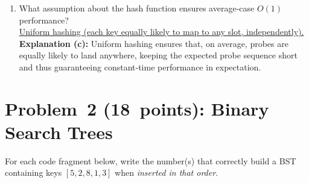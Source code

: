 \documentclass[12pt]{article}
\begin{document}
\begin{enumerate}[label=\alph*)]
  \item What assumption about the hash function ensures average‐case \(O(1)\) performance?\\
    \underline{Uniform hashing (each key equally likely to map to any slot, independently).}
    \\
    \textbf{Explanation (c):}  
    Uniform hashing ensures that, on average, probes are equally likely to land anywhere, keeping the expected probe sequence short and thus guaranteeing constant‐time performance in expectation.
\end{enumerate}

\newpage

\section*{Problem 2 (18 points): Binary Search Trees}
For each code fragment below, write the number(s) that correctly build a BST containing keys \([5,2,8,1,3]\) when \emph{inserted in that order}.
\end{document}
